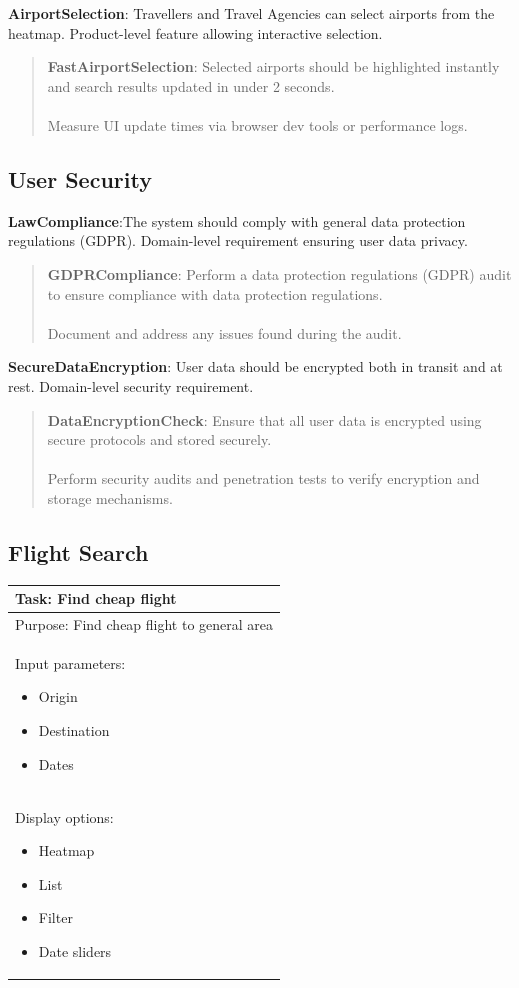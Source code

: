 \textbf{AirportSelection}: Travellers and Travel Agencies can select airports from the heatmap. Product-level feature allowing interactive selection.
\begin{quote}
    \textbf{FastAirportSelection}: Selected airports should be highlighted instantly and search results updated in under 2 seconds. \\ \\ 
    Measure UI update times via browser dev tools or performance logs.
\end{quote}

\subsection{User Security}
\textbf{LawCompliance}:The system should comply with general data protection regulations (GDPR). Domain-level requirement ensuring user data privacy.
\begin{quote}
    \textbf{GDPRCompliance}: Perform a data protection regulations (GDPR) audit to ensure compliance with data protection regulations. \\ \\
    Document and address any issues found during the audit.
\end{quote}
\textbf{SecureDataEncryption}: User data should be encrypted both in transit and at rest. Domain-level security requirement.
\begin{quote}
    \textbf{DataEncryptionCheck}: Ensure that all user data is encrypted using secure protocols and stored securely. \\ \\
    Perform security audits and penetration tests to verify encryption and storage mechanisms.
\end{quote}

\subsection{Flight Search}

\begin{tabular}{|p{}|}
    \hline
    \textbf{Task: Find cheap flight}\\
    \hline
    Purpose: Find cheap flight to general area\\
    \hline
    Input parameters:
    \begin{itemize}
        \item Origin
        \item Destination
        \item Dates
    \end{itemize}\\
    \hline
    Display options:
    \begin{itemize}
        \item Heatmap
        \item List
        \item Filter
        \item Date sliders
    \end{itemize}\\
    \hline
\end{tabular}

